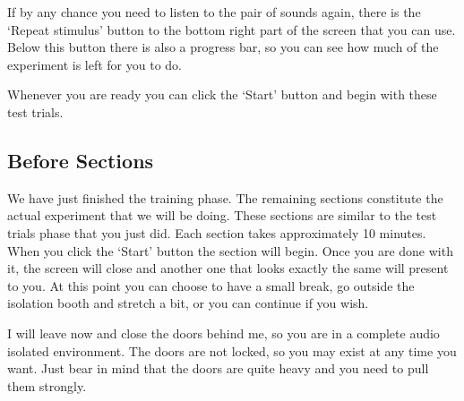 \documentclass[../main.tex]{subfiles}
\begin{document}
If by any chance you need to listen to the pair of sounds again, there is the
`Repeat stimulus' button to the bottom right part of the screen that you can
use. Below this button there is also a progress bar, so you can see how much of
the experiment is left for you to do.

Whenever you are ready you can click the `Start' button and begin with these
test trials.

\subsection{Before Sections}
\label{sub:before_sections}

We have just finished the training phase. The remaining sections constitute the
actual experiment that we will be doing. These sections are similar to the test
trials phase that you just did. Each section takes approximately 10 minutes.
When you click the `Start' button the section will begin. Once you are done with
it, the screen will close and another one that looks exactly the same will
present to you. At this point you can choose to have a small break, go outside
the isolation booth and stretch a bit, or you can continue if you wish.

I will leave now and close the doors behind me, so you are in a complete audio
isolated environment. The doors are not locked, so you may exist at any time
you want. Just bear in mind that the doors are quite heavy and you need to pull
them strongly.
\end{document}
